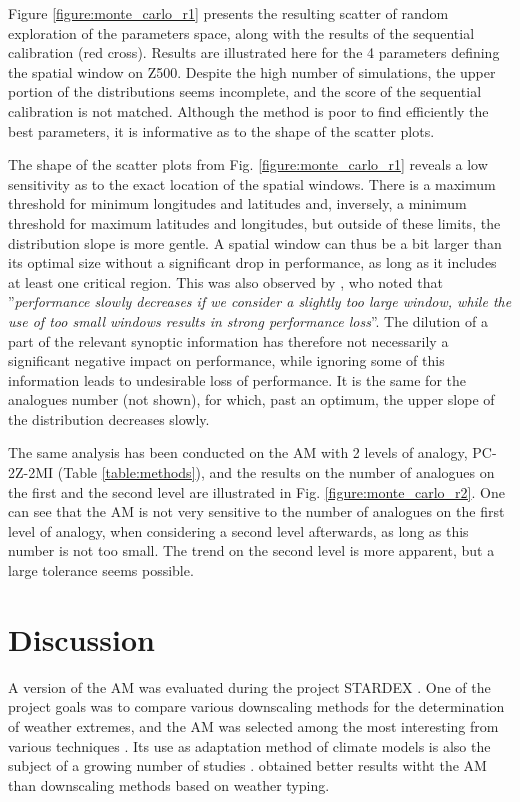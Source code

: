 \documentclass[review]{elsarticle}
\begin{document}
Figure \ref{figure:monte_carlo_r1} presents the resulting scatter of random exploration of the parameters space, along with the results of the sequential calibration (red cross). Results are illustrated here for the 4 parameters defining the spatial window on Z500. Despite the high number of simulations, the upper portion of the distributions seems incomplete, and the score of the sequential calibration is not matched. Although the method is poor to find efficiently the best parameters, it is informative as to the shape of the scatter plots.

The shape of the scatter plots from Fig. \ref{figure:monte_carlo_r1} reveals a low sensitivity as to the exact location of the spatial windows. There is a maximum threshold for minimum longitudes and latitudes and, inversely, a minimum threshold for maximum latitudes and longitudes, but outside of these limits, the distribution slope is more gentle. A spatial window can thus be a bit larger than its optimal size without a significant drop in performance, as long as it includes at least one critical region. This was also observed by \citet{Bontron2004}, who noted that ''\textit{performance slowly decreases if we consider a slightly too large window, while the use of too small windows results in strong performance loss}''. The dilution of a part of the relevant synoptic information has therefore not necessarily a significant negative impact on performance, while ignoring some of this information leads to undesirable loss of performance. It is the same for the analogues number (not shown), for which, past an optimum, the upper slope of the distribution decreases slowly.

The same analysis has been conducted on the AM with 2 levels of analogy, PC-2Z-2MI (Table \ref{table:methods}), and the results on the number of analogues on the first and the second level are illustrated in Fig. \ref{figure:monte_carlo_r2}. One can see that the AM is not very sensitive to the number of analogues on the first level of analogy, when considering a second level afterwards, as long as this number is not too small. The trend on the second level is more apparent, but a large tolerance seems possible.

\section{Discussion}
\label{sec:discussion}


A version of the AM was evaluated during the project STARDEX \citep[\textit{STAtistical and Regional dynamical Downscaling of EXtremes for European regions}, see][]{Goodess2003, Stardex2005}. One of the project goals was to compare various downscaling methods for the determination of weather extremes, and the AM was selected among the most interesting from various techniques \citep{Maheras2005, Schmidli2007}. Its use as adaptation method of climate models is also the subject of a growing number of studies \citep{Zorita1999, Wetterhall2005, Wetterhall2007, Matulla2007, Chardon2014, Dayon2015}. \citet{Bliefernicht2010} obtained better results witht the AM than downscaling methods based on weather typing.
\end{document}
